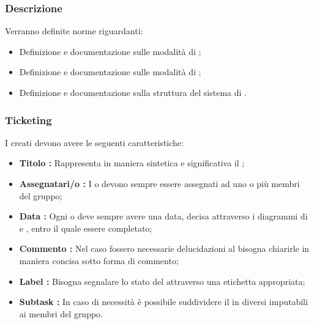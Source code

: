 \documentclass[12pt,a4paper]{article}
\begin{document}
\subsubsection{Descrizione} 
Verranno definite norme riguardanti:
\begin{itemize}
  \item Definizione e documentazione sulle modalità di \textit{} ;
  \item Definizione e documentazione sulle modalità di \textit{};
  \item Definizione e documentazione sulla struttura del sistema di \textit{}.
\end{itemize}

\subsubsection{Ticketing} 
I \textit{} creati devono avere le seguenti caratteristiche:
\begin{itemize}
  \item \textbf{Titolo : } Rappresenta in maniera sintetica e significativa il \textit{};
  \item \textbf{Assegnatari/o : } I \textit{} o \textit{} devono sempre essere assegnati ad uno o più membri del gruppo;
  \item \textbf{Data : } Ogni \textit{} o \textit{} deve sempre avere una data, decisa attraverso i diagrammi di \textit{} e \textit{}, entro il quale essere completato;
  \item \textbf{Commento : } Nel caso fossero necessarie delucidazioni al \textit{} bisogna chiarirle in maniera concisa sotto forma di commento;
  \item \textbf{Label : } Bisogna segnalare lo stato del \textit{} attraverso una etichetta appropriata;
  \item \textbf{Subtask : } In caso di necessità è possibile suddividere il \textit{} in diversi \textit{} imputabili ai membri del gruppo.
\end{itemize}
\end{document}
